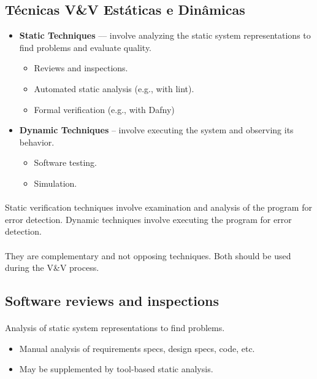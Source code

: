 \documentclass[../ESOF_notes.tex]{subfiles}
\begin{document}
    \subsection{Técnicas V\&V Estáticas e Dinâmicas}
        \begin{itemize}
            \item \textbf{Static Techniques} –– involve analyzing the 
            static system representations to find problems and 
            evaluate quality.
                \begin{itemize}
                    \item Reviews and inspections.
                    \item Automated static analysis (e.g., with lint).
                    \item Formal verification (e.g., with Dafny)
                \end{itemize}
            \item \textbf{Dynamic Techniques} – involve executing the system and
            observing its behavior.
                \begin{itemize}
                    \item Software testing.
                    \item Simulation.
                \end{itemize}
        \end{itemize}
        \paragraph{}
        Static verification techniques involve examination and
        analysis of the program for error detection. Dynamic
        techniques involve executing the program for error
        detection. 
        \paragraph{}
        They are complementary and not opposing techniques.
        Both should be used during the V\&V process.
\pagebreak       
    \subsection{Software reviews and inspections}
        \paragraph{}
        Analysis of static system representations to find problems.
        \begin{itemize}
            \item Manual analysis of requirements specs, 
            design specs, code, etc.
            \item  May be supplemented by tool-based 
            static analysis.
        \end{itemize}
\end{document}
